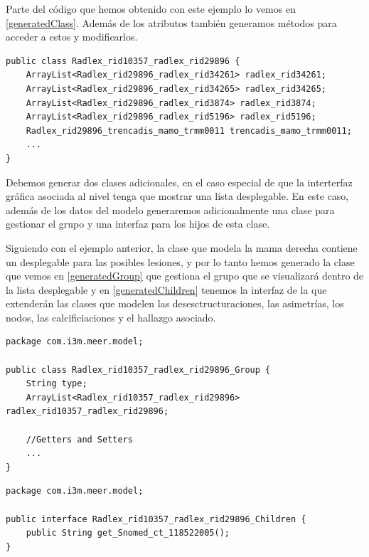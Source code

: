 Parte del código que hemos obtenido con este ejemplo lo vemos en \ref{generatedClass}. Además de los atributos también generamos métodos para acceder a estos y modificarlos.\par

\begin{lstlisting}[label=generatedClass,caption=Clase generada automáticamente]
public class Radlex_rid10357_radlex_rid29896 {
    ArrayList<Radlex_rid29896_radlex_rid34261> radlex_rid34261;
    ArrayList<Radlex_rid29896_radlex_rid34265> radlex_rid34265;
    ArrayList<Radlex_rid29896_radlex_rid3874> radlex_rid3874;
    ArrayList<Radlex_rid29896_radlex_rid5196> radlex_rid5196;
    Radlex_rid29896_trencadis_mamo_trmm0011 trencadis_mamo_trmm0011;
    ...
}
\end{lstlisting}

Debemos generar dos clases adicionales, en el caso especial de que la interterfaz gráfica asociada al nivel tenga que mostrar una lista desplegable. En este caso, además de los datos del modelo generaremos adicionalmente una clase para gestionar el grupo y una interfaz para los hijos de esta clase.\par
Siguiendo con el ejemplo anterior, la clase que modela la mama derecha contiene un desplegable para las posibles lesiones, y por lo tanto hemos generado la clase que vemos en \ref{generatedGroup} que gestiona el grupo que se visualizará dentro de la  lista desplegable y en \ref{generatedChildren} tenemos la interfaz de la que extenderán las clases que modelen las desesctructuraciones, las asimetrías, los nodos, las calcificiaciones y el hallazgo asociado.\par

\begin{lstlisting}[label=generatedGroup,caption=Clase generada automáticamente para tratar con el grupo de una lista desplegable]
package com.i3m.meer.model;

public class Radlex_rid10357_radlex_rid29896_Group {
    String type;
    ArrayList<Radlex_rid10357_radlex_rid29896> radlex_rid10357_radlex_rid29896;

    //Getters and Setters
    ...
}
\end{lstlisting}

\begin{lstlisting}[label=generatedChildren,caption=Interfaz generada automáticamente para gestionar lista desplegable]
package com.i3m.meer.model;

public interface Radlex_rid10357_radlex_rid29896_Children {
    public String get_Snomed_ct_118522005();
}
\end{lstlisting}

